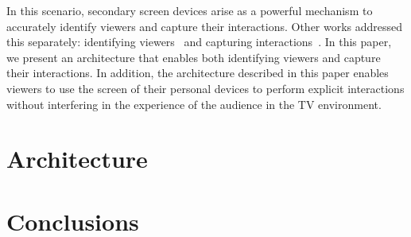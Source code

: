 \documentclass[conference,a4paper]{IEEEtran}
\begin{document}
In this scenario, secondary screen devices arise as a powerful mechanism to accurately identify viewers and  capture their interactions. Other works addressed this separately: identifying viewers~\cite{Cabarcos2011,Hwang2007} and capturing interactions~\cite{Teixeira2010}. In this paper, we present an architecture that enables both identifying viewers and capture their interactions. In addition, the architecture described in this paper enables viewers to use the screen of their personal devices to perform explicit interactions without interfering in the experience of the audience in the TV environment.

\section{Architecture}

\section{Conclusions}



\end{document}
